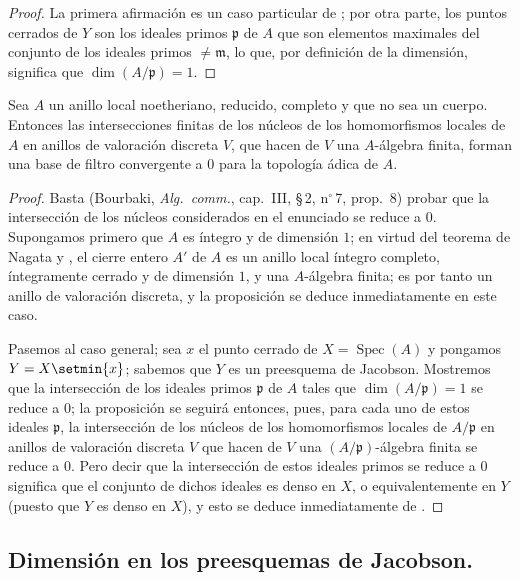 \begin{proof}
La primera afirmación es un caso particular de ; por otra parte, los puntos cerrados de $Y$ son los ideales primos $\mathfrak{p}$ de $A$ que son elementos maximales del conjunto de los ideales primos $\neq\mathfrak{m}$, lo que, por definición de la dimensión, significa que $\dim(A/\mathfrak{p})=1$.
\end{proof}

\begin{proposition}[10.5.10]
\label{IV.10.5.10}
Sea $A$ un anillo local noetheriano, reducido, completo y que no sea un cuerpo.
Entonces las intersecciones finitas de los núcleos de los homomorfismos locales de $A$ en anillos de valoración discreta $V$, que hacen de $V$ una $A$-álgebra finita, forman una base de filtro convergente a $0$ para la topología ádica de $A$.
\end{proposition}

\begin{proof}
Basta (Bourbaki, \emph{Alg.\ comm.}, cap.~III, \S\,2, n$^\circ$\,7, prop.~8) probar que la intersección de los núcleos considerados en el enunciado se reduce a $0$.
Supongamos primero que $A$ es íntegro y de dimensión $1$; en virtud del teorema de Nagata  y , el cierre entero $A'$ de $A$ es un anillo local íntegro completo,
íntegramente cerrado y de dimensión $1$, y una $A$-álgebra finita; es por tanto un anillo de valoración discreta, y la proposición se deduce inmediatamente en este caso.

Pasemos al caso general; sea $x$ el punto cerrado de $X=\operatorname{Spec}(A)$ y pongamos $Y=X\setmin\{x\}$; sabemos  que $Y$ es un preesquema de Jacobson.
Mostremos que la intersección de los ideales primos $\mathfrak{p}$ de $A$ tales que $\dim(A/\mathfrak{p})=1$ se reduce a $0$; la proposición se seguirá entonces, pues, para cada uno de estos ideales $\mathfrak{p}$, la intersección de los núcleos de los homomorfismos locales de $A/\mathfrak{p}$ en anillos de valoración discreta $V$ que hacen de $V$ una $(A/\mathfrak{p})$-álgebra finita se reduce a $0$.
Pero decir que la intersección de estos ideales primos se reduce a $0$ significa que el conjunto de dichos ideales es denso en $X$, o equivalentemente en $Y$ (puesto que $Y$ es denso en $X$), y esto se deduce inmediatamente de .
\end{proof}

\subsection{Dimensión en los preesquemas de Jacobson.}
\label{subsection:IV.10.6}

